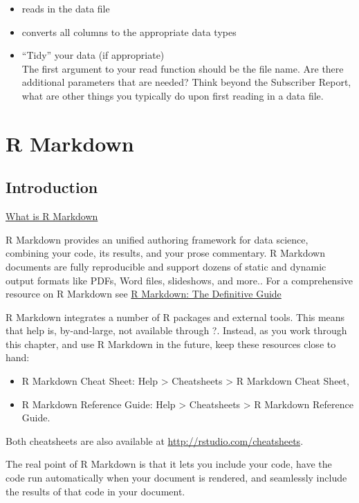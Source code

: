 \documentclass[]{book}
\providecommand{\tightlist}{%
  \setlength{\itemsep}{0pt}\setlength{\parskip}{0pt}}
\begin{document}
\begin{itemize}
\tightlist
\item
  reads in the data file
\item
  converts all columns to the appropriate data types
\item
  ``Tidy'' your data (if appropriate)\\
  The first argument to your read function should be the file name. Are
  there additional parameters that are needed? Think beyond the
  Subscriber Report, what are other things you typically do upon first
  reading in a data file.
\end{itemize}

\chapter{R Markdown}\label{r-markdown}

\section{Introduction}\label{introduction}

\href{https://player.vimeo.com/video/178485416}{What is R Markdown}

R Markdown provides an unified authoring framework for data science,
combining your code, its results, and your prose commentary. R Markdown
documents are fully reproducible and support dozens of static and
dynamic output formats like PDFs, Word files, slideshows, and more.. For
a comprehensive resource on R Markdown see
\href{https://bookdown.org/yihui/rmarkdown/}{R Markdown: The Definitive
Guide}

R Markdown integrates a number of R packages and external tools. This
means that help is, by-and-large, not available through ?. Instead, as
you work through this chapter, and use R Markdown in the future, keep
these resources close to hand:

\begin{itemize}
\tightlist
\item
  R Markdown Cheat Sheet: Help \textgreater{} Cheatsheets \textgreater{}
  R Markdown Cheat Sheet,
\item
  R Markdown Reference Guide: Help \textgreater{} Cheatsheets
  \textgreater{} R Markdown Reference Guide.
\end{itemize}

Both cheatsheets are also available at
\url{http://rstudio.com/cheatsheets}.

The real point of R Markdown is that it lets you include your code, have
the code run automatically when your document is rendered, and
seamlessly include the results of that code in your document.
\end{document}
